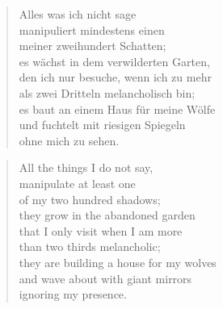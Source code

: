 \clearpage

\begin{verse}
Alles was ich nicht sage\\
manipuliert mindestens einen\\
meiner zweihundert Schatten;\\
es wächst in dem verwilderten Garten,\\
den ich nur besuche, wenn ich zu mehr\\
als zwei Dritteln melancholisch bin;\\
es baut an einem Haus für meine Wölfe\\
und fuchtelt mit riesigen Spiegeln\\
ohne mich zu sehen.
\end{verse}

\clearpage

\begin{verse}
All the things I do not say,\\
manipulate at least one\\
of my two hundred shadows;\\
they grow in the abandoned garden\\
that I only visit when I am more\\
than two thirds melancholic;\\
they are building a house for my wolves\\
and wave about with giant mirrors\\
ignoring my presence.
\end{verse}

